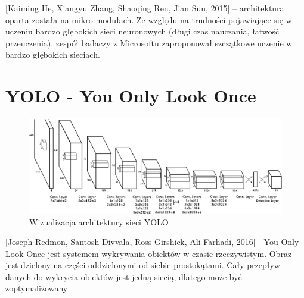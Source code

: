 \documentclass[12pt,a4paper,twoside,titlepage,openright]{book}
\begin{document}
[Kaiming He, Xiangyu Zhang, Shaoqing Ren, Jian Sun, 2015] -- architektura oparta została na mikro modułach. Ze względu na trudności pojawiające się w uczeniu bardzo głębokich sieci neuronowych (długi czas nauczania, łatwość przeuczenia), zespół badaczy z Microsoftu zaproponował szczątkowe uczenie w bardzo głębokich sieciach. 

\cite{DBLP:journals/corr/HeZRS15}




\section{YOLO - You Only Look Once}
\begin{figure}[ht]
	\centering
			\includegraphics[resolution=100, scale=0.5]{YOLO.png}
		\caption{Wizualizacja architektury sieci YOLO}
\end{figure}

[Joseph Redmon, Santosh Divvala, Ross Girshick, Ali Farhadi, 2016] - You Only Look Once jest systemem wykrywania obiektów w czasie rzeczywistym. Obraz jest dzielony na części oddzielonymi od siebie prostokątami.
Cały przepływ danych do wykrycia obiektów jest jedną siecią, dlatego może być zoptymalizowany \cite{DBLP:journals/corr/RedmonDGF15}
\end{document}
